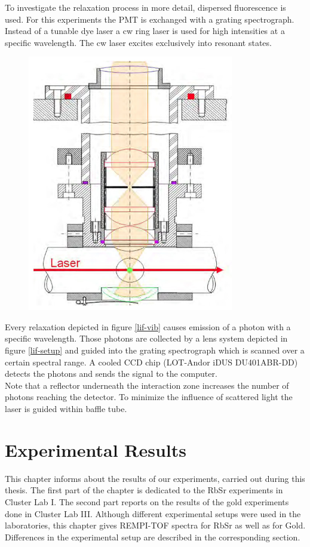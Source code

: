 \documentclass[parskip,12pt,headsepline,a4paper] {scrbook}
\begin{document}
To investigate the relaxation process in more detail, dispersed fluorescence is used. For this experiments the PMT is exchanged with a grating spectrograph. Instead of a tunable dye laser a cw ring laser is used for high intensities at a specific wavelength. The cw laser excites exclusively into resonant states.
\begin{figure}[ht]
\centerline{
\includegraphics[width=9cm]{./measuring_methods/lif-setup.jpg}}
\end{figure}
Every relaxation depicted in figure \ref{lif-vib} causes emission of a photon with a specific wavelength. Those photons are collected by a lens system depicted in figure \ref{lif-setup} and guided into the grating spectrograph which is scanned over a certain spectral range. A cooled CCD chip (LOT-Andor iDUS DU401ABR-DD) detects the photons and sends the signal to the computer. \\
Note that a reflector underneath the interaction zone increases the number of photons reaching the detector. To minimize the influence of scattered light the laser is guided within baffle tube.


\chapter{Experimental Results}
\label{chap:results}
\vspace{-1\baselineskip}
This chapter informs about the results of our experiments, carried out during this thesis. The first part of the chapter is dedicated to the RbSr experiments in Cluster Lab I. The second part reports on the results of the gold experiments done in Cluster Lab III. Although different experimental setups were used in the laboratories, this chapter gives REMPI-TOF spectra for RbSr as well as for Gold. Differences in the experimental setup are described in the corresponding section.
\end{document}
